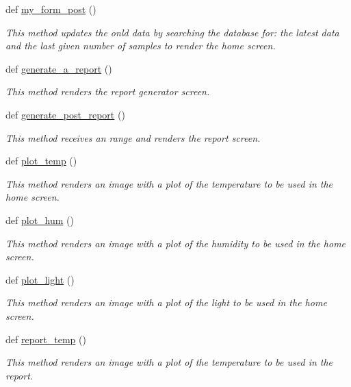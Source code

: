 \begin{DoxyCompactItemize}
def \hyperlink{namespacesleep__app_ae8191a45b113c7edb32a779efa12a392}{my\+\_\+form\+\_\+post} ()
\begin{DoxyCompactList}\small\item\em This method updates the onld data by searching the database for\+: the latest data and the last given number of samples to render the home screen. \end{DoxyCompactList}\item 
def \hyperlink{namespacesleep__app_aa0cc2c43bae36abfe4a0824a3afa2e80}{generate\+\_\+a\+\_\+report} ()
\begin{DoxyCompactList}\small\item\em This method renders the report generator screen. \end{DoxyCompactList}\item 
def \hyperlink{namespacesleep__app_aadd0af86ba51234f2888f2bd03fe4d00}{generate\+\_\+post\+\_\+report} ()
\begin{DoxyCompactList}\small\item\em This method receives an range and renders the report screen. \end{DoxyCompactList}\item 
def \hyperlink{namespacesleep__app_a2bde4dd5ac826c71f2bc1943415cb2e3}{plot\+\_\+temp} ()
\begin{DoxyCompactList}\small\item\em This method renders an image with a plot of the temperature to be used in the home screen. \end{DoxyCompactList}\item 
def \hyperlink{namespacesleep__app_a8ca94cb4379eb59bf0e3c8f6946c323b}{plot\+\_\+hum} ()
\begin{DoxyCompactList}\small\item\em This method renders an image with a plot of the humidity to be used in the home screen. \end{DoxyCompactList}\item 
def \hyperlink{namespacesleep__app_acffc6c22f7ca7893205010154c31cc88}{plot\+\_\+light} ()
\begin{DoxyCompactList}\small\item\em This method renders an image with a plot of the light to be used in the home screen. \end{DoxyCompactList}\item 
def \hyperlink{namespacesleep__app_a6f717173c23196c59198e2a8bd49f5d0}{report\+\_\+temp} ()
\begin{DoxyCompactList}\small\item\em This method renders an image with a plot of the temperature to be used in the report. \end{DoxyCompactList}\item 

\end{DoxyCompactItemize}

